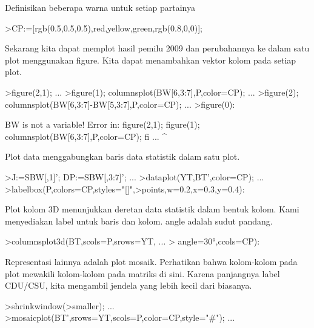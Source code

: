 \documentclass{article}
\begin{document}
\begin{eulernotebook}
\begin{eulercomment}
Definisikan beberapa warna untuk setiap partainya
\end{eulercomment}
\begin{eulerprompt}
>CP:=[rgb(0.5,0.5,0.5),red,yellow,green,rgb(0.8,0,0)];
\end{eulerprompt}
\begin{eulercomment}
Sekarang kita dapat memplot hasil pemilu 2009 dan perubahannya ke
dalam satu plot menggunakan figure. Kita dapat menambahkan vektor
kolom pada setiap plot.
\end{eulercomment}
\begin{eulerprompt}
>figure(2,1);  ...
>figure(1); columnsplot(BW[6,3:7],P,color=CP); ...
>figure(2); columnsplot(BW[6,3:7]-BW[5,3:7],P,color=CP);  ...
>figure(0):
\end{eulerprompt}
\begin{euleroutput}
  BW is not a variable!
  Error in:
  figure(2,1);  figure(1); columnsplot(BW[6,3:7],P,color=CP); fi ...
                                                ^
\end{euleroutput}
\begin{eulercomment}
Plot data menggabungkan baris data statistik dalam satu plot.
\end{eulercomment}
\begin{eulerprompt}
>J:=SBW[,1]'; DP:=SBW[,3:7]'; ...
>dataplot(YT,BT',color=CP);  ...
>labelbox(P,colors=CP,styles="[]",>points,w=0.2,x=0.3,y=0.4):
\end{eulerprompt}
\begin{eulercomment}
Plot kolom 3D menunjukkan deretan data statistik dalam bentuk kolom.
Kami menyediakan label untuk baris dan kolom. angle adalah sudut
pandang.
\end{eulercomment}
\begin{eulerprompt}
>columnsplot3d(BT,scols=P,srows=YT, ...
>  angle=30°,ccols=CP):
\end{eulerprompt}
\begin{eulercomment}
Representasi lainnya adalah plot mosaik. Perhatikan bahwa kolom-kolom
pada plot mewakili kolom-kolom pada matriks di sini. Karena panjangnya
label CDU/CSU, kita mengambil jendela yang lebih kecil dari biasanya.
\end{eulercomment}
\begin{eulerprompt}
>shrinkwindow(>smaller);  ...
>mosaicplot(BT',srows=YT,scols=P,color=CP,style="#"); ...

\end{eulerprompt}
\end{eulernotebook}
\end{document}
